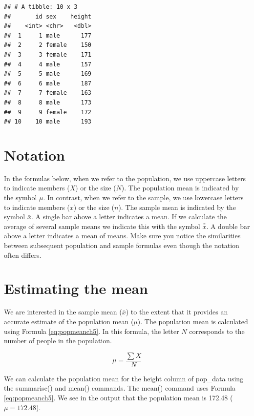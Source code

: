 \documentclass[
]{krantz}
\begin{document}
\begin{verbatim}
## # A tibble: 10 x 3
##       id sex    height
##    <int> <chr>   <dbl>
##  1     1 male      177
##  2     2 female    150
##  3     3 female    171
##  4     4 male      157
##  5     5 male      169
##  6     6 male      187
##  7     7 female    163
##  8     8 male      173
##  9     9 female    172
## 10    10 male      193
\end{verbatim}

\hypertarget{notation}{%
\section{Notation}\label{notation}}

In the formulas below, when we refer to the population, we use uppercase letters to indicate members (\(X\)) or the size (\(N\)). The population mean is indicated by the symbol \(\mu\). In contrast, when we refer to the sample, we use lowercase letters to indicate members (\(x\)) or the size (\(n\)). The sample mean is indicated by the symbol \(\bar{x}\). A single bar above a letter indicates a mean. If we calculate the average of several sample means we indicate this with the symbol \(\bar{\bar{x}}\). A double bar above a letter indicates a mean of means. Make sure you notice the similarities between subsequent population and sample formulas even though the notation often differs.

\hypertarget{estimating-the-mean}{%
\section{Estimating the mean}\label{estimating-the-mean}}

We are interested in the sample mean (\(\bar{x}\)) to the extent that it provides an accurate estimate of the population mean (\(\mu\)). The population mean is calculated using Formula \eqref{eq:popmeanch5}. In this formula, the letter \(N\) corresponds to the number of people in the population.

\begin{equation} 
\mu = \frac{\sum{X}}{N}
      \label{eq:popmeanch5}
\end{equation}

We can calculate the population mean for the height column of pop\_data using the summarise() and mean() commands. The mean() command uses Formula \eqref{eq:popmeanch5}. We see in the output that the population mean is 172.48 (\(\mu = 172.48\)).
\end{document}
